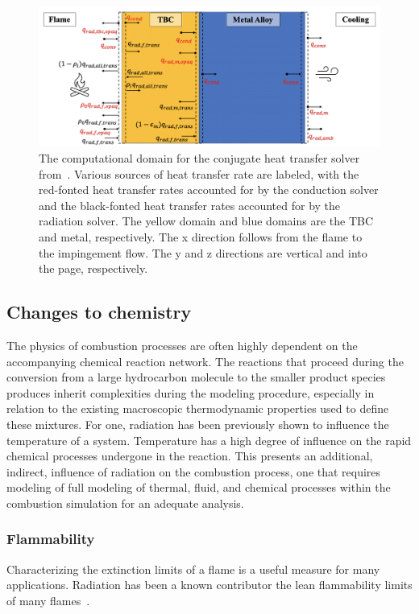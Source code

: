 \begin{figure}
\centering
\includegraphics[width=1\linewidth]{figures/ch2/TBC.png}
\caption{The computational domain for the conjugate heat transfer solver from~\cite{Tricard2021ModelingEnvironments.}. Various sources of heat transfer rate are labeled, with the red-fonted heat transfer rates accounted for by the conduction solver and the black-fonted heat transfer rates accounted for by the radiation solver. The yellow domain and blue domains are the TBC and metal, respectively. The x direction follows from the flame to the impingement flow. The y and z directions are vertical and into the page, respectively. }
\label{fig:TBC}
\end{figure}

\subsection{Changes to chemistry}
The physics of combustion processes are often highly dependent on the accompanying chemical reaction network.
The reactions that proceed during the conversion from a large hydrocarbon molecule to the smaller product species produces inherit complexities during the modeling procedure, especially in relation to the existing macroscopic thermodynamic properties used to define these mixtures.
For one, radiation has been previously shown to influence the temperature of a system. Temperature has a high degree of influence on the rapid chemical processes undergone in the reaction.
This presents an additional, indirect, influence of radiation on the combustion process, one that requires modeling of full modeling of thermal, fluid, and chemical processes within the combustion simulation for an adequate analysis.

\subsubsection{Flammability}
Characterizing the extinction limits of a flame is a useful measure for many applications. Radiation has been a known contributor the lean flammability limits of many flames~\cite{Ju2000AsymptoticFlames}.

